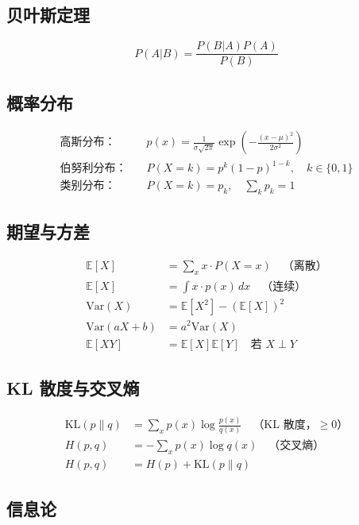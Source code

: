 \subsection{贝叶斯定理}

\begin{equation}
P(A|B) = \frac{P(B|A)P(A)}{P(B)}
\end{equation}

\subsection{概率分布}

\begin{align}
\text{高斯分布：} \quad & p(x) = \frac{1}{\sigma\sqrt{2\pi}} \exp\left(-\frac{(x-\mu)^2}{2\sigma^2}\right) \\
\text{伯努利分布：} \quad & P(X=k) = p^k(1-p)^{1-k}, \quad k \in \{0, 1\} \\
\text{类别分布：} \quad & P(X=k) = p_k, \quad \sum_{k} p_k = 1
\end{align}

\subsection{期望与方差}

\begin{align}
\mathbb{E}[X] &= \sum_x x \cdot P(X=x) \quad \text{（离散）} \\
\mathbb{E}[X] &= \int x \cdot p(x) \, dx \quad \text{（连续）} \\
\text{Var}(X) &= \mathbb{E}[X^2] - (\mathbb{E}[X])^2 \\
\text{Var}(aX + b) &= a^2 \text{Var}(X) \\
\mathbb{E}[XY] &= \mathbb{E}[X]\mathbb{E}[Y] \quad \text{若 } X \perp Y
\end{align}

\subsection{KL 散度与交叉熵}

\begin{align}
\text{KL}(p \| q) &= \sum_x p(x)\log\frac{p(x)}{q(x)} \quad \text{（KL 散度，$\geq 0$）} \\
H(p, q) &= -\sum_x p(x)\log q(x) \quad \text{（交叉熵）} \\
H(p, q) &= H(p) + \text{KL}(p \| q)
\end{align}

\subsection{信息论}


